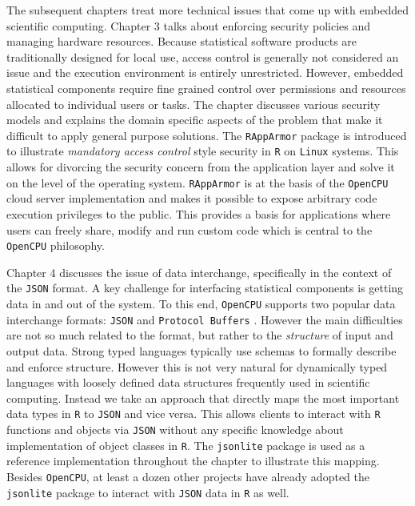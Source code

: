 The subsequent chapters treat more technical issues that come up with embedded scientific computing. Chapter 3 talks about enforcing security policies and managing hardware resources. Because statistical software products are traditionally designed for local use, access control is generally not considered an issue and the execution environment is entirely unrestricted. However, embedded statistical components require fine grained control over permissions and resources allocated to individual users or tasks. The chapter discusses various security models and explains the domain specific aspects of the problem that make it difficult to apply general purpose solutions. The \texttt{RAppArmor} package is introduced to illustrate \emph{mandatory access control} style security in \texttt{R} on \texttt{Linux} systems. This allows for divorcing the security concern from the application layer and solve it on the level of the operating system. \texttt{RAppArmor} is at the basis of the \texttt{OpenCPU} cloud server implementation and makes it possible to expose arbitrary code execution privileges to the public. This provides a basis for applications where users can freely share, modify and run custom code which is central to the \texttt{OpenCPU} philosophy.

Chapter 4 discusses the issue of data interchange, specifically in the context of the \texttt{JSON} format. A key challenge for interfacing statistical components is getting data in and out of the system. To this end, \texttt{OpenCPU} supports two popular data interchange formats: \texttt{JSON} and \texttt{Protocol Buffers} \citep{rprotobuf}. However the main difficulties are not so much related to the format, but rather to the \emph{structure} of input and output data. Strong typed languages typically use schemas to formally describe and enforce structure. However this is not very natural for dynamically typed languages with loosely defined data structures frequently used in scientific computing. Instead we take an approach that directly maps the most important data types in \texttt{R} to \texttt{JSON} and vice versa. This allows clients to interact with \texttt{R} functions and objects via \texttt{JSON} without any specific knowledge about implementation of object classes in \texttt{R}. The \texttt{jsonlite} package is used as a reference implementation throughout the chapter to illustrate this mapping. Besides \texttt{OpenCPU}, at least a dozen other projects have already adopted the \texttt{jsonlite} package to interact with \texttt{JSON} data in \texttt{R} as well.

